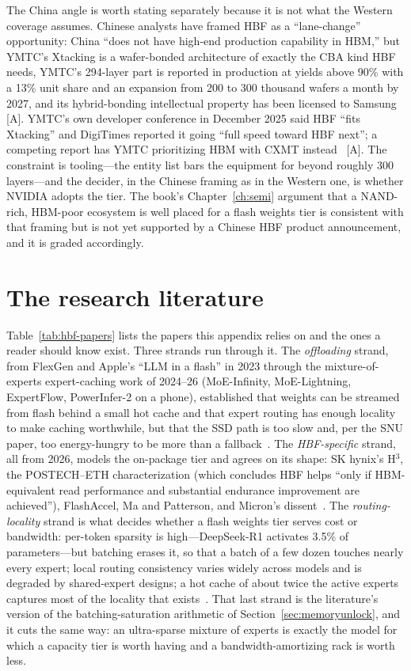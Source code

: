 The China angle is worth stating separately because it is not what the Western coverage assumes. Chinese analysts have framed HBF as a ``lane-change'' opportunity: China ``does not have high-end production capability in HBM,'' but YMTC's Xtacking is a wafer-bonded architecture of exactly the CBA kind HBF needs, YMTC's 294-layer part is reported in production at yields above 90\% with a 13\% unit share and an expansion from 200 to 300 thousand wafers a month by 2027, and its hybrid-bonding intellectual property has been licensed to Samsung~\cite{hbf-huxiu} [A]. YMTC's own developer conference in December 2025 said HBF ``fits Xtacking'' and DigiTimes reported it going ``full speed toward HBF next''; a competing report has YMTC prioritizing HBM with CXMT instead~\cite{hbf-ymtc,hbf-crazyrich} [A]. The constraint is tooling---the entity list bars the equipment for beyond roughly 300 layers---and the decider, in the Chinese framing as in the Western one, is whether NVIDIA adopts the tier. The book's Chapter~\ref{ch:semi} argument that a NAND-rich, HBM-poor ecosystem is well placed for a flash weights tier is consistent with that framing but is not yet supported by a Chinese HBF product announcement, and it is graded accordingly.

\section{The research literature}

Table~\ref{tab:hbf-papers} lists the papers this appendix relies on and the ones a reader should know exist. Three strands run through it. The \emph{offloading} strand, from FlexGen and Apple's ``LLM in a flash'' in 2023 through the mixture-of-experts expert-caching work of 2024--26 (MoE-Infinity, MoE-Lightning, ExpertFlow, PowerInfer-2 on a phone), established that weights can be streamed from flash behind a small hot cache and that expert routing has enough locality to make caching worthwhile, but that the SSD path is too slow and, per the SNU paper, too energy-hungry to be more than a fallback~\cite{hbf-offload,ssd-energy}. The \emph{HBF-specific} strand, all from 2026, models the on-package tier and agrees on its shape: SK hynix's H$^3$, the POSTECH--ETH characterization (which concludes HBF helps ``only if HBM-equivalent read performance and substantial endurance improvement are achieved''), FlashAccel, Ma and Patterson, and Micron's dissent~\cite{hbf-h3,hbf-postech,hbf-flashaccel,hbf-ma-patterson,hbf-micron-hotinfra}. The \emph{routing-locality} strand is what decides whether a flash weights tier serves cost or bandwidth: per-token sparsity is high---DeepSeek-R1 activates 3.5\% of parameters---but batching erases it, so that a batch of a few dozen touches nearly every expert; local routing consistency varies widely across models and is degraded by shared-expert designs; a hot cache of about twice the active experts captures most of the locality that exists~\cite{hbf-routing,ssd-energy}. That last strand is the literature's version of the batching-saturation arithmetic of Section~\ref{sec:memoryunlock}, and it cuts the same way: an ultra-sparse mixture of experts is exactly the model for which a capacity tier is worth having and a bandwidth-amortizing rack is worth less.

